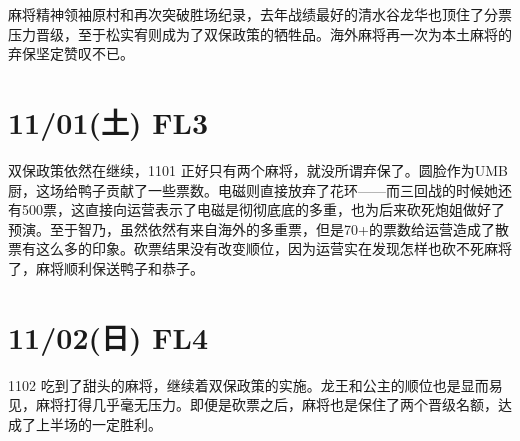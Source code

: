 麻将精神领袖原村和再次突破胜场纪录，去年战绩最好的清水谷龙华也顶住了分票压力晋级，至于松实宥则成为了双保政策的牺牲品。海外麻将再一次为本土麻将的弃保坚定赞叹不已。

\section{11/01(土) FL3}


双保政策依然在继续，1101 正好只有两个麻将，就没所谓弃保了。圆脸作为UMB厨，这场给鸭子贡献了一些票数。电磁则直接放弃了花环——而三回战的时候她还有500票，这直接向运营表示了电磁是彻彻底底的多重，也为后来砍死炮姐做好了预演。至于智乃，虽然依然有来自海外的多重票，但是70+的票数给运营造成了散票有这么多的印象。砍票结果没有改变顺位，因为运营实在发现怎样也砍不死麻将了，麻将顺利保送鸭子和恭子。

\section{11/02(日) FL4}


1102 吃到了甜头的麻将，继续着双保政策的实施。龙王和公主的顺位也是显而易见，麻将打得几乎毫无压力。即便是砍票之后，麻将也是保住了两个晋级名额，达成了上半场的一定胜利。

